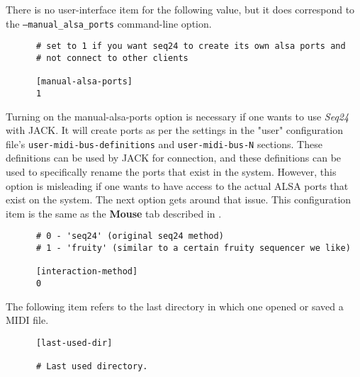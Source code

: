    There is no user-interface item for the following value, but
   it does correspond to the \texttt{--manual\_alsa\_ports} command-line
   option.

   \begin{verbatim}
      # set to 1 if you want seq24 to create its own alsa ports and
      # not connect to other clients

      [manual-alsa-ports]
      1
   \end{verbatim}

   Turning on the manual-alsa-ports option is necessary if one
   wants to use \textsl{Seq24} with JACK.
   It will create ports as per the settings in the "user" configuration file's
   \texttt{user-midi-bus-definitions} and \texttt{user-midi-bus-N} sections.
   These definitions can be used by JACK for connection, and these definitions
   can be used to specifically rename the ports that exist in the system.
   However, this option is misleading if one wants to have access to the
   actual ALSA ports that exist on the system.
   The next option gets around that issue.
   This configuration item is the same as the 
   \textbf{Mouse} tab described in
   .

   \begin{verbatim}
      # 0 - 'seq24' (original seq24 method)
      # 1 - 'fruity' (similar to a certain fruity sequencer we like)

      [interaction-method]
      0
   \end{verbatim}


   The following item refers to the last directory in which one opened or
   saved a MIDI file.

   \begin{verbatim}
      [last-used-dir]

      # Last used directory.
   \end{verbatim}

